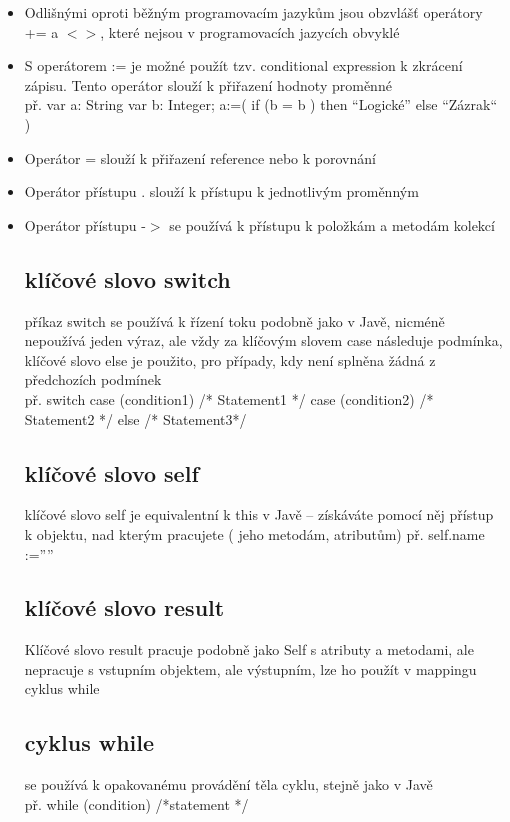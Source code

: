 \documentclass[11pt,a4paper]{article}   	%
\begin{document}
\begin{itemize}
  \item		Odlišnými oproti běžným programovacím jazykům jsou obzvlášť operátory
  			+= a $<>$, které nejsou v programovacích jazycích obvyklé
  \item		S operátorem := je možné použít tzv.  conditional expression k zkrácení
  			zápisu. Tento operátor slouží k přiřazení  hodnoty proměnné \\př. var a:
  			String var b: Integer; a:=( if (b = b ) then “Logické” else “Zázrak“ )
  \item		Operátor = slouží k přiřazení reference nebo k porovnání
  \item 	Operátor přístupu . slouží k přístupu k jednotlivým proměnným
  \item 	Operátor přístupu -$>$ se používá k přístupu k položkám a metodám
  kolekcí

\subsection{klíčové slovo switch}
příkaz switch se používá k řízení toku podobně jako v Javě, nicméně nepoužívá
jeden výraz,  ale vždy za klíčovým slovem case následuje podmínka, klíčové slovo
else je použito, pro případy, kdy není splněna žádná z předchozích podmínek \\
př. switch { case (condition1) /* Statement1 */ case (condition2) /* Statement2 */ else /* Statement3*/ }

\subsection {klíčové slovo self}
klíčové slovo self je equivalentní k this v Javě – získáváte pomocí něj přístup 
k objektu, nad kterým pracujete ( jeho metodám, atributům) př. self.name :=””

\subsection {klíčové slovo result}
Klíčové slovo result pracuje podobně jako Self s atributy a metodami, ale
nepracuje s  vstupním objektem, ale výstupním, lze ho použít v mappingu cyklus while

\subsection{cyklus while}
se používá k opakovanému provádění těla cyklu, stejně jako v Javě \\
př. while (condition){ /*statement */ }


\end{itemize}
\end{document}
